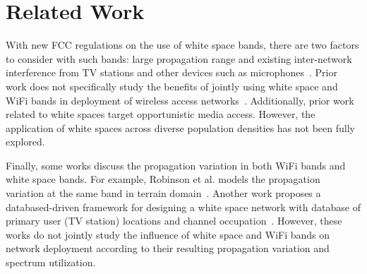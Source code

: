 \section{Related Work}
\label{sec:related}

With new FCC regulations on the use of white space bands, there are two factors to
consider with such bands: large propagation range and existing inter-network interference from 
TV stations and other devices such as microphones~\cite{fccwhitespace,cui2013leveraging,bahl2009white}.
Prior work does not specifically study the benefits of jointly using white space and WiFi bands in
deployment of wireless access networks~\cite{akyildiz2005wireless}. Additionally, prior work related
to white spaces target opportunistic media access. However, the application of white spaces 
across diverse population densities has not been fully explored.
 
Finally, some works discuss the propagation variation in both WiFi bands and white space bands.
For example, Robinson et al. models the propagation variation at the same band in terrain 
domain~\cite{robinson2010deploying}. Another work proposes a databased-driven framework for
designing a white space network with database of primary user (TV station) locations and channel 
occupation~\cite{murty2012senseless}. However, these works do not jointly study
the influence of white space and WiFi bands on network deployment according to their resulting 
propagation variation and spectrum utilization.

